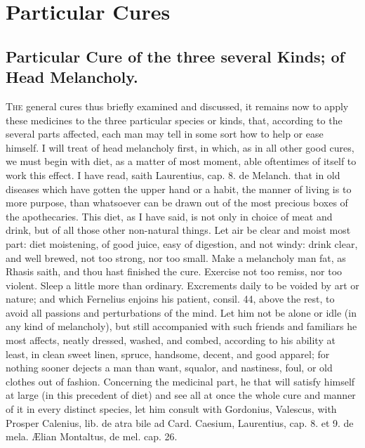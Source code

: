 \chapter{Particular Cures}

\section[Cure of three kinds]{Particular Cure of the three several Kinds; of Head Melancholy.}

\lettrine{T}{he} general cures thus briefly examined and discussed, it remains now
to apply these medicines to the three particular species or kinds,
that, according to the several parts affected, each man may tell in
some sort how to help or ease himself. I will treat of head melancholy
first, in which, as in all other good cures, we must begin with diet,
as a matter of most moment, able oftentimes of itself to work this
effect. I have read, saith Laurentius, cap. 8. de Melanch. that in old
diseases which have gotten the upper hand or a habit, the manner of
living is to more purpose, than whatsoever can be drawn out of the most
precious boxes of the apothecaries. This diet, as I have said, is not
only in choice of meat and drink, but of all those other non-natural
things. Let air be clear and moist most part: diet moistening, of good
juice, easy of digestion, and not windy: drink clear, and well brewed,
not too strong, nor too small. Make a melancholy man fat, as
Rhasis saith, and thou hast finished the cure. Exercise not too
remiss, nor too violent. Sleep a little more than ordinary.
Excrements daily to be voided by art or nature; and which
Fernelius enjoins his patient, consil. 44, above the rest, to avoid all
passions and perturbations of the mind. Let him not be alone or idle
(in any kind of melancholy), but still accompanied with such friends
and familiars he most affects, neatly dressed, washed, and combed,
according to his ability at least, in clean sweet linen, spruce,
handsome, decent, and good apparel; for nothing sooner dejects a man
than want, squalor, and nastiness, foul, or old clothes out of fashion.
Concerning the medicinal part, he that will satisfy himself at large
(in this precedent of diet) and see all at once the whole cure and
manner of it in every distinct species, let him consult with Gordonius,
Valescus, with Prosper Calenius, lib. de atra bile ad Card. Caesium,
Laurentius, cap. 8. et 9. de mela. \AE{}lian Montaltus, de mel. cap. 26.

